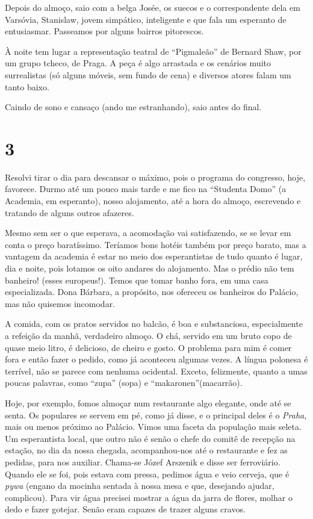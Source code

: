 Depois do almoço, saio com a belga Josée, os suecos e o correspondente dela em Varsóvia, Stanislaw, jovem simpático, inteligente e que fala um esperanto de entusiasmar. Passeamos por alguns bairros pitorescos.

À noite tem lugar a representação teatral de ``Pigmaleão'' de Bernard Shaw, por um grupo tcheco, de Praga. A peça é algo arrastada e os cenários muito surrealistas (só alguns móveis, sem fundo de cena) e diversos atores falam um tanto baixo.

Caindo de sono e cansaço (ando me estranhando), saio antes do final.

\section*{3 \adfflatleafright {}}
Resolvi tirar o dia para descansar o máximo, pois o programa do congresso, hoje, favorece. Durmo até um pouco mais tarde e me fico na ``Studenta Domo'' (a Academia, em esperanto), nosso alojamento, até a hora do almoço, escrevendo e tratando de alguns outros afazeres.

Mesmo sem ser o que esperava, a acomodação vai satisfazendo, se se levar em conta o preço baratíssimo. Teríamos bons hotéis também por preço barato, mas a vantagem da academia é estar no meio dos esperantistas de tudo quanto é lugar, dia e noite, pois lotamos os oito andares do alojamento. Mas o prédio não tem banheiro! (esses europeus!). Temos que tomar banho fora, em uma casa especializada. Dona Bárbara, a propósito, nos ofereceu os banheiros do Palácio, mas não quisemos incomodar.

A comida, com os pratos servidos no balcão, é boa e substanciosa, especialmente a refeição da manhã, verdadeiro almoço. O chá, servido em um bruto copo de quase meio litro, é delicioso, de cheiro e gosto. O problema para mim é comer fora e então fazer o pedido, como já aconteceu algumas vezes. A língua polonesa é terrível, não se parece com nenhuma ocidental. Exceto, felizmente, quanto a umas poucas palavras, como ``zupa'' (sopa) e ``makaronen''(macarrão).

Hoje, por exemplo, fomos almoçar num restaurante algo elegante, onde até se senta. Os populares se servem em pé, como já disse, e o principal deles é o \textit{Praha}, mais ou menos próximo ao Palácio. Vimos uma faceta da população mais seleta. Um esperantista local, que outro não é senão o chefe do comitê de recepção na estação, no dia da nossa chegada, acompanhou-nos até o restaurante e fez as pedidas, para nos auxiliar. Chama-se Józef Arszenik e disse ser ferroviário. Quando ele se foi, pois estava com pressa, pedimos água e veio cerveja, que é \textit{pywa} (engano da mocinha sentada à nossa mesa e que, desejando ajudar, complicou). Para vir água precisei mostrar a água da jarra de flores, molhar o dedo e fazer gotejar. Senão eram capazes de trazer alguns cravos.

